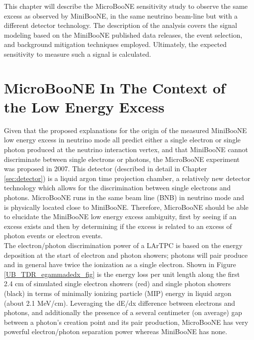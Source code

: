 This chapter will describe the MicroBooNE sensitivity study to observe the same excess as observed by MiniBooNE, in the same neutrino beam-line but with a different detector technology. The description of the analysis covers the signal modeling based on the MiniBooNE published data releases, the event selection, and background mitigation techniques employed. Ultimately, the expected sensitivity to measure such a signal is calculated.

\section{MicroBooNE In The Context of the Low Energy Excess}

Given that the proposed explanations for the origin of the measured MiniBooNE low energy excess in neutrino mode all predict either a single electron or single photon produced at the neutrino interaction vertex, and that MiniBooNE cannot discriminate between single electrons or photons, the MicroBooNE experiment was proposed in 2007. This detector (described in detail in Chapter \ref{sec:detector}) is a liquid argon time projection chamber, a relatively new detector technology which allows for the discrimination between single electrons and photons. MicroBooNE runs in the same beam line (BNB) in neutrino mode and is physically located close to MiniBooNE. Therefore, MicroBooNE should be able to elucidate the MiniBooNE low energy excess ambiguity, first by seeing if an excess exists and then by determining if the excess is related to an excess of photon events or electron events.\\

The electron/photon discrimination power of a LArTPC is based on the energy deposition at the start of electron and photon showers; photons will pair produce and in general have twice the ionization as a single electron. Shown in Figure \ref{UB_TDR_egammadedx_fig} is the energy loss per unit length along the first 2.4 cm of simulated single electron showers (red) and single photon showers (black) in terms of minimally ionizing particle (MIP) energy in liquid argon (about 2.1 MeV/cm). Leveraging the dE/dx difference between electrons and photons, and additionally the presence of a several centimeter (on average) gap between a photon's creation point and its pair production, MicroBooNE has very powerful electron/photon separation power whereas MiniBooNE has none.\\

